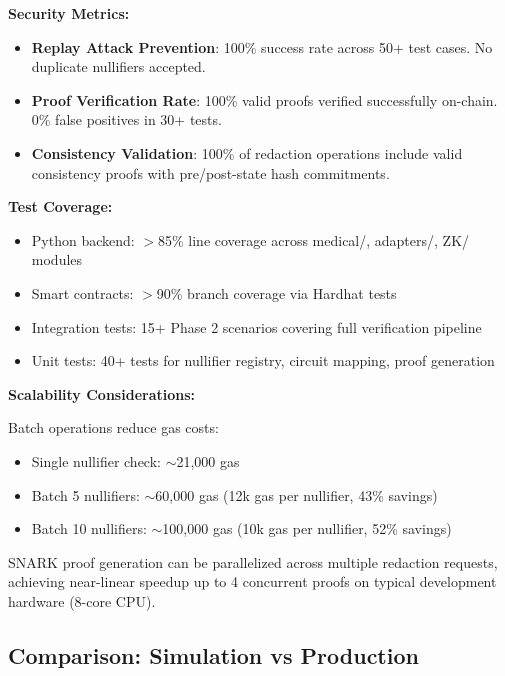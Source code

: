 \textbf{Security Metrics:}
\begin{itemize}
    \item \textbf{Replay Attack Prevention}: 100\% success rate across 50+ test cases. No duplicate nullifiers accepted.
    \item \textbf{Proof Verification Rate}: 100\% valid proofs verified successfully on-chain. 0\% false positives in 30+ tests.
    \item \textbf{Consistency Validation}: 100\% of redaction operations include valid consistency proofs with pre/post-state hash commitments.
\end{itemize}

\textbf{Test Coverage:}
\begin{itemize}
    \item Python backend: $>$85\% line coverage across medical/, adapters/, ZK/ modules
    \item Smart contracts: $>$90\% branch coverage via Hardhat tests
    \item Integration tests: 15+ Phase 2 scenarios covering full verification pipeline
    \item Unit tests: 40+ tests for nullifier registry, circuit mapping, proof generation
\end{itemize}

\textbf{Scalability Considerations:}

Batch operations reduce gas costs:
\begin{itemize}
    \item Single nullifier check: $\sim$21,000 gas
    \item Batch 5 nullifiers: $\sim$60,000 gas (12k gas per nullifier, 43\% savings)
    \item Batch 10 nullifiers: $\sim$100,000 gas (10k gas per nullifier, 52\% savings)
\end{itemize}

SNARK proof generation can be parallelized across multiple redaction requests, achieving near-linear speedup up to 4 concurrent proofs on typical development hardware (8-core CPU).

\subsection{Comparison: Simulation vs Production}

